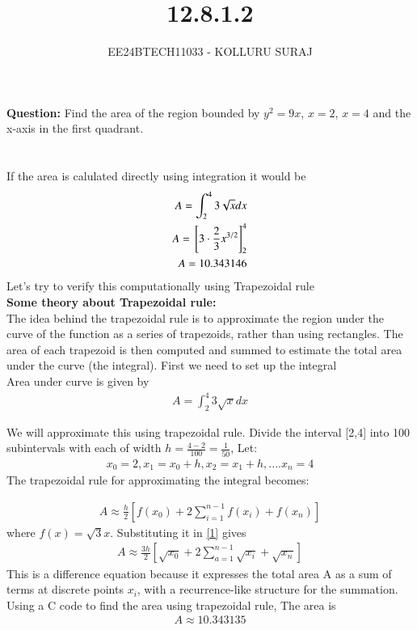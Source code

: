 \documentclass[journal]{IEEEtran}
\numberwithin{equation}{enumi}
\numberwithin{figure}{enumi}
\begin{document}

\title{12.8.1.2}
\author{EE24BTECH11033 - KOLLURU SURAJ}
{\let\newpage\relax\maketitle}
\textbf{Question:} 
Find the area of the region bounded by $y^2=9x$, $x=2$, $x=4$ and the x-axis in the first quadrant.
\\\\
\solution\\
If the area is calulated directly using integration it would be 
\begin{align}
     A= \int_{2}^{4} 3\sqrt{x}dx\\
     A={}\left[3\cdot \frac{2}{3} x^{3/2}\right]_2^4\\
     A =10.343146
\end{align}
Let's try to verify this computationally using Trapezoidal rule\\
\textbf{Some theory about Trapezoidal rule:}\\
The idea behind the trapezoidal rule is to approximate the region under the curve of the function as a series of trapezoids, rather than using rectangles. The area of each trapezoid is then computed and summed to estimate the total area under the curve (the integral).
First we need to set up the integral\\
Area under curve is given by
\begin{align}
    A= \int_{2}^{4} 3\sqrt{x}dx
\end{align}

We will approximate this using trapezoidal rule. Divide the interval [2,4] into 100 subintervals with each of width $h=\frac{4-2}{100}=\frac{1}{50}$, Let:
\begin{align}
x_0=2,x_1=x_0+h,x_2=x_1+h,....x_n=4
\end{align}
The trapezoidal rule for approximating the integral becomes:

\begin{align}
    A \approx\frac{h}{2}[f(x_0)+ 2\sum_{i=1}^{n-1} f(x_i) +f(x_n)]\label{1}
\end{align}
where $f(x)= \sqrt{3}x$. Substituting it in \ref{1} gives
\begin{align}
     A \approx\frac{3h}{2}[\sqrt{x_0}+ 2\sum_{a=1}^{n-1} \sqrt{x_i} +\sqrt{x_n}]
\end{align}
This is a difference equation because it expresses the total area A as a sum of terms at discrete points $x_i$, with a recurrence-like structure for the summation.\\
Using a C code to find the area using trapezoidal rule, The area is
\begin{align}
    A\approx 10.343135
\end{align}
\end{document}

